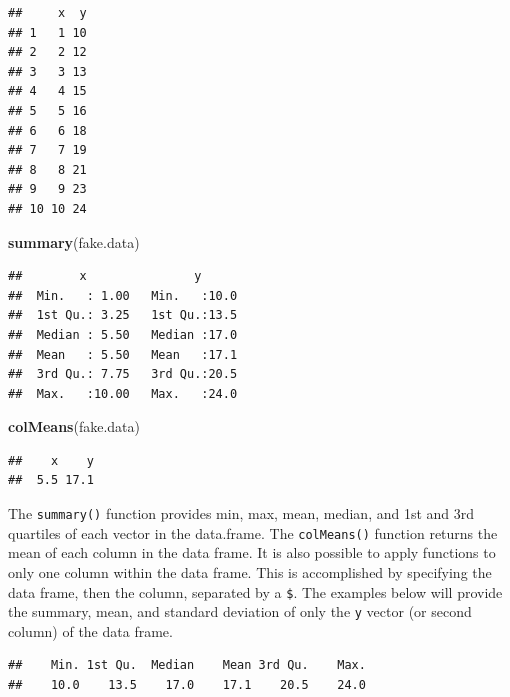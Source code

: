 \documentclass[letterpaper,]{book}
\newenvironment{Shaded}{\begin{snugshade}}{\end{snugshade}}
\newcommand{\KeywordTok}[1]{\textcolor[rgb]{0.13,0.29,0.53}{\textbf{#1}}}
\newcommand{\NormalTok}[1]{#1}
\newcommand{\OperatorTok}[1]{\textcolor[rgb]{0.81,0.36,0.00}{\textbf{#1}}}
\begin{document}
\begin{verbatim}
##     x  y
## 1   1 10
## 2   2 12
## 3   3 13
## 4   4 15
## 5   5 16
## 6   6 18
## 7   7 19
## 8   8 21
## 9   9 23
## 10 10 24
\end{verbatim}

\begin{Shaded}
\begin{Highlighting}[]
\KeywordTok{summary}\NormalTok{(fake.data)}
\end{Highlighting}
\end{Shaded}

\begin{verbatim}
##        x               y       
##  Min.   : 1.00   Min.   :10.0  
##  1st Qu.: 3.25   1st Qu.:13.5  
##  Median : 5.50   Median :17.0  
##  Mean   : 5.50   Mean   :17.1  
##  3rd Qu.: 7.75   3rd Qu.:20.5  
##  Max.   :10.00   Max.   :24.0
\end{verbatim}

\begin{Shaded}
\begin{Highlighting}[]
\KeywordTok{colMeans}\NormalTok{(fake.data)}
\end{Highlighting}
\end{Shaded}

\begin{verbatim}
##    x    y 
##  5.5 17.1
\end{verbatim}

The \texttt{summary()} function provides min, max, mean, median, and 1st and 3rd quartiles of each vector in the data.frame. The \texttt{colMeans()} function returns the mean of each column in the data frame. It is also possible to apply functions to only one column within the data frame. This is accomplished by specifying the data frame, then the column, separated by a \texttt{\$}. The examples below will provide the summary, mean, and standard deviation of only the \texttt{y} vector (or second column) of the data frame.

\begin{Shaded}
\end{Shaded}

\begin{verbatim}
##    Min. 1st Qu.  Median    Mean 3rd Qu.    Max. 
##    10.0    13.5    17.0    17.1    20.5    24.0
\end{verbatim}
\end{document}

